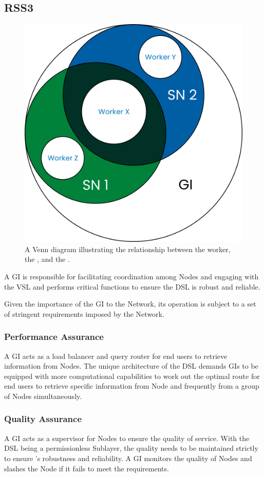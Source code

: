 \subsection{RSS3 }
\label{subsec:GI}

{
    \begin{figure}[tb!]
        \centering
        \includegraphics[width=0.7\columnwidth]{figures/GI.png}
        \caption{A Venn diagram illustrating the relationship between the worker, the , and the .}
        \label{fig:GI}
    \end{figure}
}

A \gls{GI} is responsible for facilitating coordination among \glspl{Node} and engaging with the \gls{VSL} and performs critical functions to ensure the \gls{DSL} is robust and reliable.

Given the importance of the \gls{GI} to the Network, its operation is subject to a set of stringent requirements imposed by the Network.

\subsubsection{Performance Assurance} A GI acts as a load balancer and query router for end users to retrieve information from \glspl{Node}.
The unique architecture of the \gls{DSL} demands \glspl{GI} to be equipped with more computational capabilities to work out the optimal route for end users to retrieve specific information from \gls{Node} and frequently from a group of \glspl{Node} simultaneously.

\subsubsection{Quality Assurance} A GI acts as a supervisor for \glspl{Node} to ensure the quality of service.
With the \gls{DSL} being a permissionless Sublayer, the quality needs to be maintained strictly to ensure 's robustness and reliability.
A \gls{GI} monitors the quality of \glspl{Node} and slashes the \gls{Node} if it fails to meet the requirements.


